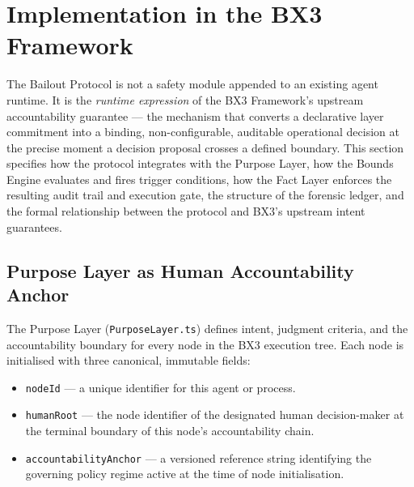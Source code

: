 \documentclass[12pt]{article}
\begin{document}

\section{Implementation in the BX3 Framework}
\label{sec:bailout-implementation}

The Bailout Protocol is not a safety module appended to an existing agent runtime. It is the \emph{runtime expression} of the BX3 Framework's upstream accountability guarantee --- the mechanism that converts a declarative layer commitment into a binding, non-configurable, auditable operational decision at the precise moment a decision proposal crosses a defined boundary. This section specifies how the protocol integrates with the Purpose Layer, how the Bounds Engine evaluates and fires trigger conditions, how the Fact Layer enforces the resulting audit trail and execution gate, the structure of the forensic ledger, and the formal relationship between the protocol and BX3's upstream intent guarantees.

\subsection{Purpose Layer as Human Accountability Anchor}
\label{sec:purpose-layer-anchor}

The Purpose Layer (\texttt{PurposeLayer.ts}) defines intent, judgment criteria, and the accountability boundary for every node in the BX3 execution tree. Each node is initialised with three canonical, immutable fields:

\begin{itemize}
  \item \texttt{nodeId} --- a unique identifier for this agent or process.
  \item \texttt{humanRoot} --- the node identifier of the designated human decision-maker at the terminal boundary of this node's accountability chain.
  \item \texttt{accountabilityAnchor} --- a versioned reference string identifying the governing policy regime active at the time of node initialisation.
\end{itemize}
\end{document}
